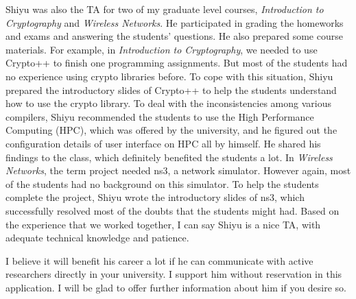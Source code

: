\documentclass{article}
\begin{document}
Shiyu was also the TA for two of my graduate level courses, \emph{Introduction to Cryptography} and \emph{Wireless Networks}. He participated in grading the homeworks and exams and answering the students' questions. He also prepared some course materials. For example, in \emph{Introduction to Cryptography}, we needed to use Crypto++ to finish one programming assignments. But most of the students had no experience using crypto libraries before. To cope with this situation, Shiyu prepared the introductory slides of Crypto++ to help the students understand how to use the crypto library. To deal with the inconsistencies among various compilers, Shiyu recommended the students to use the High Performance Computing (HPC), which was offered by the university, and he figured out the configuration details of user interface on HPC all by himself. He shared his findings to the class, which definitely benefited the students a lot. In \emph{Wireless Networks}, the term project needed ns3, a network simulator. However again, most of the students had no background on this simulator. To help the students complete the project, Shiyu wrote the introductory slides of ns3, which successfully resolved most of the doubts that the students might had. Based on the experience that we worked together, I can say Shiyu is a nice TA, with adequate technical knowledge and patience.

I believe it will benefit his career a lot if he can communicate with active researchers directly in your university. I support him without reservation in this application. I will be glad to offer further information about him if you desire so.



\end{document}
